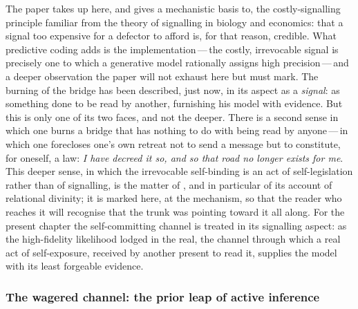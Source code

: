 The paper takes up here, and gives a mechanistic basis to, the costly-signalling principle familiar from the theory of signalling in biology and economics: that a signal too expensive for a defector to afford is, for that reason, credible. What predictive coding adds is the implementation\,---\,the costly, irrevocable signal is precisely one to which a generative model rationally assigns high precision\,---\,and a deeper observation the paper will not exhaust here but must mark. The burning of the bridge has been described, just now, in its aspect as a \emph{signal}: as something done to be read by another, furnishing his model with evidence. But this is only one of its two faces, and not the deeper. There is a second sense in which one burns a bridge that has nothing to do with being read by anyone\,---\,in which one forecloses one's own retreat not to send a message but to constitute, for oneself, a law: \emph{I have decreed it so, and so that road no longer exists for me}. This deeper sense, in which the irrevocable self-binding is an act of self-legislation rather than of signalling, is the matter of , and in particular of its account of relational divinity; it is marked here, at the mechanism, so that the reader who reaches it will recognise that the trunk was pointing toward it all along. For the present chapter the self-committing channel is treated in its signalling aspect: as the high-fidelity likelihood lodged in the real, the channel through which a real act of self-exposure, received by another present to read it, supplies the model with its least forgeable evidence.

\subsubsection{The wagered channel: the prior leap of active inference}
\label{p13:sub:mech-wager}

